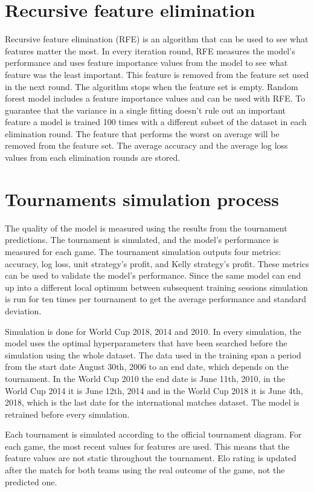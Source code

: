 \section{Recursive feature elimination}
Recursive feature elimination (RFE) is an algorithm that can be used to see what features matter the most. In every iteration round, RFE measures the model's performance and uses feature importance values from the model to see what feature was the least important. This feature is removed from the feature set used in the next round. The algorithm stops when the feature set is empty. \cite{granitto2006recursive} Random forest model includes a feature importance values and can be used with RFE. To guarantee that the variance in a single fitting doesn't rule out an important feature a model is trained 100 times with a different subset of the dataset in each elimination round. The feature that performs the worst on average will be removed from the feature set. The average accuracy and the average log loss values from each elimination rounds are stored.

\section{Tournaments simulation process}
The quality of the model is measured using the results from the tournament predictions. The tournament is simulated, and the model's performance is measured for each game. The tournament simulation outputs four metrics: accuracy, log loss, unit strategy's profit, and Kelly strategy's profit. These metrics can be used to validate the model's performance. Since the same model can end up into a different local optimum between subsequent training sessions simulation is run for ten times per tournament to get the average performance and standard deviation.

Simulation is done for World Cup 2018, 2014 and 2010. In every simulation, the model uses the optimal hyperparameters that have been searched before the simulation using the whole dataset. The data used in the training span a period from the start date August 30th, 2006 to an end date, which depends on the tournament. In the World Cup 2010 the end date is June 11th, 2010, in the World Cup 2014 it is June 12th, 2014 and in the World Cup 2018 it is June 4th, 2018, which is the last date for the international matches dataset. The model is retrained before every simulation.

Each tournament is simulated according to the official tournament diagram. For each game, the most recent values for features are used. This means that the feature values are not static throughout the tournament. Elo rating is updated after the match for both teams using the real outcome of the game, not the predicted one.

